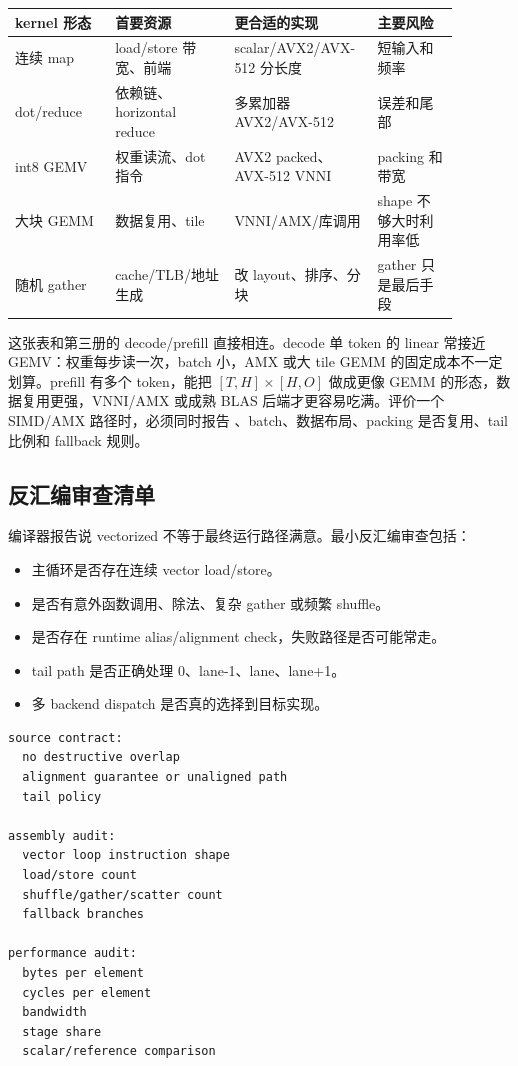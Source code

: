 \begin{center}
\small
\begin{tabular}{p{0.21\linewidth}p{0.25\linewidth}p{0.25\linewidth}p{0.17\linewidth}}
\toprule
kernel 形态 & 首要资源 & 更合适的实现 & 主要风险 \\
\midrule
连续 map & load/store 带宽、前端 & scalar/AVX2/AVX-512 分长度 & 短输入和频率 \\
dot/reduce & 依赖链、horizontal reduce & 多累加器 AVX2/AVX-512 & 误差和尾部 \\
int8 GEMV & 权重读流、dot 指令 & AVX2 packed、AVX-512 VNNI & packing 和带宽 \\
大块 GEMM & 数据复用、tile & VNNI/AMX/库调用 & shape 不够大时利用率低 \\
随机 gather & cache/TLB/地址生成 & 改 layout、排序、分块 & gather 只是最后手段 \\
\bottomrule
\end{tabular}
\end{center}

这张表和第三册的 decode/prefill 直接相连。decode 单 token 的 linear 常接近 GEMV：权重每步读一次，batch 小，AMX 或大 tile GEMM 的固定成本不一定划算。prefill 有多个 token，能把 \([T,H]\times[H,O]\) 做成更像 GEMM 的形态，数据复用更强，VNNI/AMX 或成熟 BLAS 后端才更容易吃满。评价一个 SIMD/AMX 路径时，必须同时报告 、batch、数据布局、packing 是否复用、tail 比例和 fallback 规则。

\subsection{反汇编审查清单}

编译器报告说 vectorized 不等于最终运行路径满意。最小反汇编审查包括：

\begin{itemize}
  \item 主循环是否存在连续 vector load/store。
  \item 是否有意外函数调用、除法、复杂 gather 或频繁 shuffle。
  \item 是否存在 runtime alias/alignment check，失败路径是否可能常走。
  \item tail path 是否正确处理 0、lane-1、lane、lane+1。
  \item 多 backend dispatch 是否真的选择到目标实现。
\end{itemize}

\begin{lstlisting}[numbers=none,caption={SIMD 报告的最小证据字段}]
source contract:
  no destructive overlap
  alignment guarantee or unaligned path
  tail policy

assembly audit:
  vector loop instruction shape
  load/store count
  shuffle/gather/scatter count
  fallback branches

performance audit:
  bytes per element
  cycles per element
  bandwidth
  stage share
  scalar/reference comparison
\end{lstlisting}

